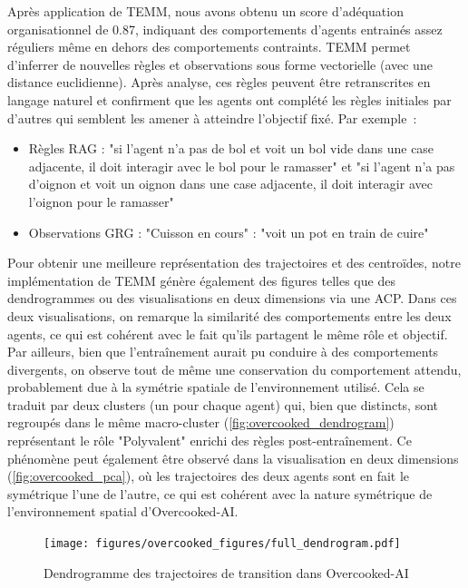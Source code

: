 \documentclass[francais,ROIA,Unicode,manuscript]{cedram}
\begin{document}
Après application de TEMM, nous avons obtenu un score d'adéquation organisationnel de 0.87, indiquant des comportements d'agents entrainés assez réguliers même en dehors des comportements contraints. TEMM permet d'inferrer de nouvelles règles et observations sous forme vectorielle (avec une distance euclidienne). Après analyse, ces règles peuvent être retranscrites en langage naturel et confirment que les agents ont complété les règles initiales par d'autres qui semblent les amener à atteindre l'objectif fixé. Par exemple~:
%
\begin{itemize}
    \item Règles RAG : "si l'agent n'a pas de bol et voit un bol vide dans une case adjacente, il doit interagir avec le bol pour le ramasser" et "si l'agent n'a pas d'oignon et voit un oignon dans une case adjacente, il doit interagir avec l'oignon pour le ramasser"
    \item Observations GRG : "Cuisson en cours" : "voit un pot en train de cuire"
\end{itemize}

Pour obtenir une meilleure représentation des trajectoires et des centroïdes, notre implémentation de TEMM génère également des figures telles que des dendrogrammes ou des visualisations en deux dimensions via une ACP. Dans ces deux visualisations, on remarque la similarité des comportements entre les deux agents, ce qui est cohérent avec le fait qu'ils partagent le même rôle et objectif. Par ailleurs, bien que l'entraînement aurait pu conduire à des comportements divergents, on observe tout de même une conservation du comportement attendu, probablement due à la symétrie spatiale de l'environnement utilisé. Cela se traduit par deux clusters (un pour chaque agent) qui, bien que distincts, sont regroupés dans le même macro-cluster (\autoref{fig:overcooked_dendrogram}) représentant le rôle "Polyvalent" enrichi des règles post-entraînement. Ce phénomène peut également être observé dans la visualisation en deux dimensions (\autoref{fig:overcooked_pca}), où les trajectoires des deux agents sont en fait le symétrique l'une de l'autre, ce qui est cohérent avec la nature symétrique de l'environnement spatial d'Overcooked-AI.

\begin{figure}[h!]
    \centering
    \texttt{[image: figures/overcooked\_figures/full\_dendrogram.pdf]}
    \caption{Dendrogramme des trajectoires de transition dans Overcooked-AI}
    \label{fig:overcooked_dendrogram}
\end{figure}
\end{document}
